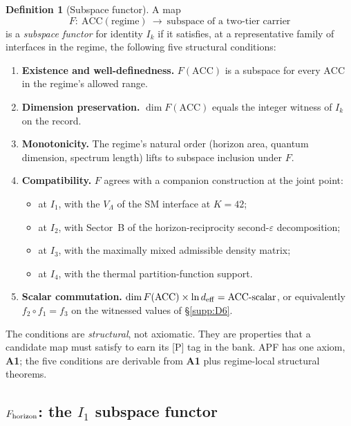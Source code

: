 \documentclass[11pt]{article}
\theoremstyle{plain}
\theoremstyle{definition}
\newtheorem{definition}[theorem]{Definition}
\theoremstyle{remark}
\newcommand{\Aone}{\textbf{A1}}
\begin{document}
\begin{definition}[Subspace functor]\label{def:subspace_functor}
A map
\[
  F :\ \mathrm{ACC}(\text{regime}) \ \longrightarrow\ \text{subspace of a two-tier carrier}
\]
is a \emph{subspace functor} for identity $I_k$ if it satisfies, at a representative family of interfaces in the regime, the following five structural conditions:
\begin{enumerate}[leftmargin=2.5em,label=\textup{(\roman*)},itemsep=4pt]
  \item \textbf{Existence and well-definedness.}  $F(\mathrm{ACC})$ is a subspace for every $\mathrm{ACC}$ in the regime's allowed range.
  \item \textbf{Dimension preservation.}  $\dim F(\mathrm{ACC})$ equals the integer witness of $I_k$ on the record.
  \item \textbf{Monotonicity.}  The regime's natural order (horizon area, quantum dimension, spectrum length) lifts to subspace inclusion under $F$.
  \item \textbf{Compatibility.}  $F$ agrees with a companion construction at the joint point:
    \begin{itemize}[leftmargin=1.5em,topsep=2pt,itemsep=1pt]
      \item at $I_1$, with the $V_\Lambda$ of the SM interface at $K = 42$;
      \item at $I_2$, with Sector~B of the horizon-reciprocity second-$\varepsilon$ decomposition;
      \item at $I_3$, with the maximally mixed admissible density matrix;
      \item at $I_4$, with the thermal partition-function support.
    \end{itemize}
  \item \textbf{Scalar commutation.}  $\dim F(\mathrm{ACC}) \times \ln d_{\rm eff} = \mathrm{ACC}\text{-scalar}$, or equivalently $f_2 \circ f_1 = f_3$ on the witnessed values of \S\ref{supp:D6}.
\end{enumerate}
The conditions are \emph{structural}, not axiomatic.  They are properties that a candidate map must satisfy to earn its [P] tag in the bank.  APF has one axiom, \Aone{}; the five conditions are derivable from \Aone{} plus regime-local structural theorems.
\end{definition}

\bigskip

\subsection{\texorpdfstring{$F_{\rm horizon}$}{F\_horizon}: the \texorpdfstring{$I_1$}{I1} subspace functor}\label{supp:E2}
\end{document}
